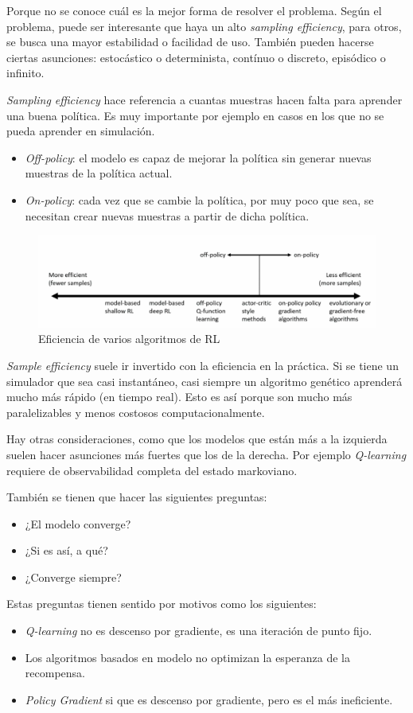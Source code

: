 Porque no se conoce cuál es la mejor forma de resolver el problema. Según el problema, puede ser
interesante que haya un alto \textit{sampling efficiency}, para otros, se busca una mayor
estabilidad o facilidad de uso. También pueden hacerse ciertas asunciones: estocástico o
determinista, contínuo o discreto, episódico o infinito.

\textit{Sampling efficiency} hace referencia a cuantas muestras hacen falta para aprender una
buena política. Es muy importante por ejemplo en casos en los que no se pueda aprender en
simulación.

\begin{itemize}
    \item \textit{Off-policy}: el modelo es capaz de mejorar la política sin generar nuevas
        muestras de la política actual.
    \item \textit{On-policy}: cada vez que se cambie la política, por muy poco que sea, se
        necesitan crear nuevas muestras a partir de dicha política.
\end{itemize}

\begin{figure}[htpb]
	\centering
	\includegraphics[width=0.8\linewidth]{figures/2020-06-12-202343_996x274_scrot.png}
	\caption{Eficiencia de varios algoritmos de RL}
\end{figure}

\textit{Sample efficiency} suele ir invertido con la eficiencia en la práctica. Si se
tiene un simulador que sea casi instantáneo, casi siempre un algoritmo genético aprenderá
mucho más rápido (en tiempo real). Esto es así porque son mucho más paralelizables y
menos costosos computacionalmente.

Hay otras consideraciones, como que los modelos que están más a la izquierda suelen hacer
asunciones más fuertes que los de la derecha. Por ejemplo \textit{Q-learning} requiere
de observabilidad completa del estado markoviano.

También se tienen que hacer las siguientes preguntas:
\begin{itemize}
    \item ¿El modelo converge?
    \item ¿Si es así, a qué?
    \item ¿Converge siempre?
\end{itemize}

Estas preguntas tienen sentido por motivos como los siguientes:
\begin{itemize}
    \item \textit{Q-learning} no es descenso por gradiente, es una iteración de punto fijo.
    \item Los algoritmos basados en modelo no optimizan la esperanza de la recompensa.
    \item \textit{Policy Gradient} si que es descenso por gradiente, pero es el más ineficiente.
\end{itemize}
